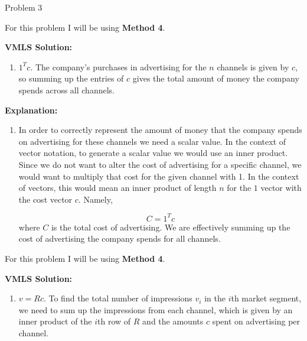 \begin{problem}{Problem 3}
    \begin{highlight}
        For this problem I will be using \textbf{Method 4}. \vspace*{1em}

        \noindent \textbf{VMLS Solution:}

        \begin{enumerate}[label = (\alph*)]
            \item $1^{T}c$. The company's purchases in advertising for the $n$ channels is given by $c$, so summing up the entries of $c$ gives the total amount of money the company spends across 
            all channels.
        \end{enumerate}

        \noindent \textbf{Explanation:}

        \begin{enumerate}[label = (\alph*)]
            \item In order to correctly represent the amount of money that the company spends on advertising for these channels we need a scalar value. In the context of vector notation, to generate
            a scalar value we would use an inner product. Since we do not want to alter the cost of advertising for a specific channel, we would want to multiply that cost for the given channel with 1.
            In the context of vectors, this would mean an inner product of length $n$ for the $1$ vector with the cost vector $c$. Namely,

            \setcounter{equation}{0}
            \begin{equation}
                C = 1^{T}c
            \end{equation}
            where $C$ is the total cost of advertising. We are effectively summing up the cost of advertising the company spends for all channels.
        \end{enumerate}
    \end{highlight}

    \begin{highlight}
        For this problem I will be using \textbf{Method 4}. \vspace*{1em}

        \noindent \textbf{VMLS Solution:}

        \begin{enumerate}[label = (\alph*), start = 2]
            \item $v = Rc$. To find the total number of impressions $v_{i}$ in the $i$th market segment, we need to sum up the impressions from each channel, which is given by an inner product of the 
            $i$th row of $R$ and the amounts $c$ spent on advertising per channel.
        \end{enumerate}


\end{highlight}
\end{problem}
